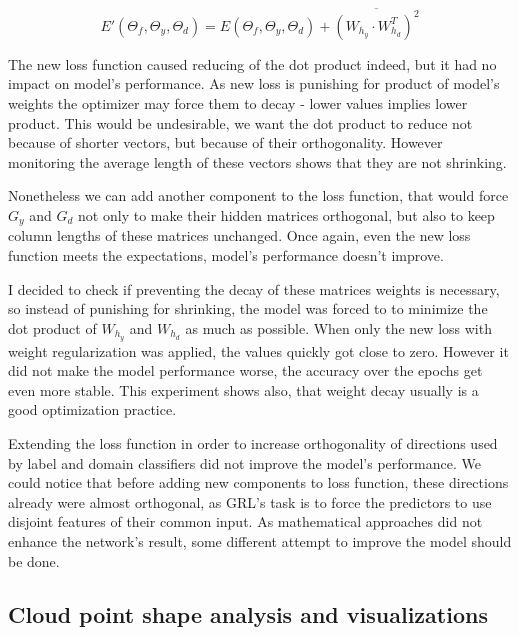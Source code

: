 \documentclass{article}
\begin{document}
\begin{equation*}
E'(\Theta_{f}, \Theta_{y}, \Theta_{d}) = E(\Theta_{f}, \Theta_{y}, \Theta_{d}) + \overline{(W_{h_{y}} \cdot W_{h_{d}}^{T})^{2}}
\end{equation*}
\par
The new loss function caused reducing of the dot product indeed, but it had no impact on model's performance. As new loss is punishing for product of model's weights the optimizer may force them to decay - lower values implies lower product. This would be undesirable, we want the dot product to reduce not because of shorter vectors, but because of their orthogonality. However monitoring the average length of these vectors shows that they are not shrinking. 
\par
Nonetheless we can add another component to the loss function, that would force $G_{y}$ and $G_{d}$ not only to make their hidden matrices orthogonal, but also to keep column lengths of these matrices unchanged. Once again, even the new loss function meets the expectations, model's performance doesn't improve.
\par
I decided to check if preventing the decay of these matrices weights is necessary, so instead of punishing for shrinking, the model was forced to to minimize the dot product of $W_{h_{y}}$ and $W_{h_{d}}$ as much as possible. When only the new loss with weight regularization was applied, the values quickly got close to zero. However it did not make the model performance worse, the accuracy over the epochs get even more stable. This experiment shows also, that weight decay usually is a good optimization practice.
\par
Extending the loss function in order to increase orthogonality of directions used by label and domain classifiers did not improve the model's performance. We could notice that before adding new components to loss function, these directions already were almost orthogonal, as GRL's task is to force the predictors to use disjoint features of their common input. As mathematical approaches did not enhance the network's result, some different attempt to improve the model should be done.

\subsection{Cloud point shape analysis and visualizations}
\end{document}
